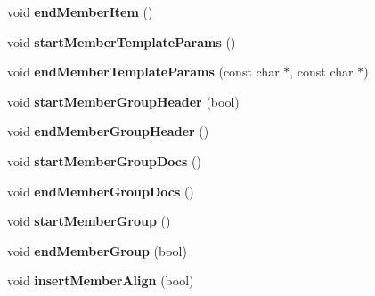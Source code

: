 \begin{DoxyCompactItemize}
\item 
\mbox{\label{class_docbook_generator_a809a668dd4691533bdc9b286bdfc62a1}} 
void {\bfseries end\+Member\+Item} ()
\item 
\mbox{\label{class_docbook_generator_a61fb3da1c36e4cd27a17ad14ed50f0b5}} 
void {\bfseries start\+Member\+Template\+Params} ()
\item 
\mbox{\label{class_docbook_generator_ac4a7a56a80f29aec7acc78597ffda9c4}} 
void {\bfseries end\+Member\+Template\+Params} (const char $\ast$, const char $\ast$)
\item 
\mbox{\label{class_docbook_generator_a0dbaa41643546a916a005fbaa9015703}} 
void {\bfseries start\+Member\+Group\+Header} (bool)
\item 
\mbox{\label{class_docbook_generator_a100a878eeb984b71baf36c69d6867a4c}} 
void {\bfseries end\+Member\+Group\+Header} ()
\item 
\mbox{\label{class_docbook_generator_ab0f4bdaf7baa049c434eb9267a730939}} 
void {\bfseries start\+Member\+Group\+Docs} ()
\item 
\mbox{\label{class_docbook_generator_a99393eb2ff7472daebc1505815970586}} 
void {\bfseries end\+Member\+Group\+Docs} ()
\item 
\mbox{\label{class_docbook_generator_a6725795d6f2f697662c57e6fd3bc8739}} 
void {\bfseries start\+Member\+Group} ()
\item 
\mbox{\label{class_docbook_generator_ab2af18403e2a23fe0deae3b3a7e54a1b}} 
void {\bfseries end\+Member\+Group} (bool)
\item 
\mbox{\label{class_docbook_generator_a03fa682034c00f869d6bf24d5c947755}} 
void {\bfseries insert\+Member\+Align} (bool)
\item 
\mbox{\label{class_docbook_generator_a5b6548041e988bafab0cfa936153157b}} 

\end{DoxyCompactItemize}
